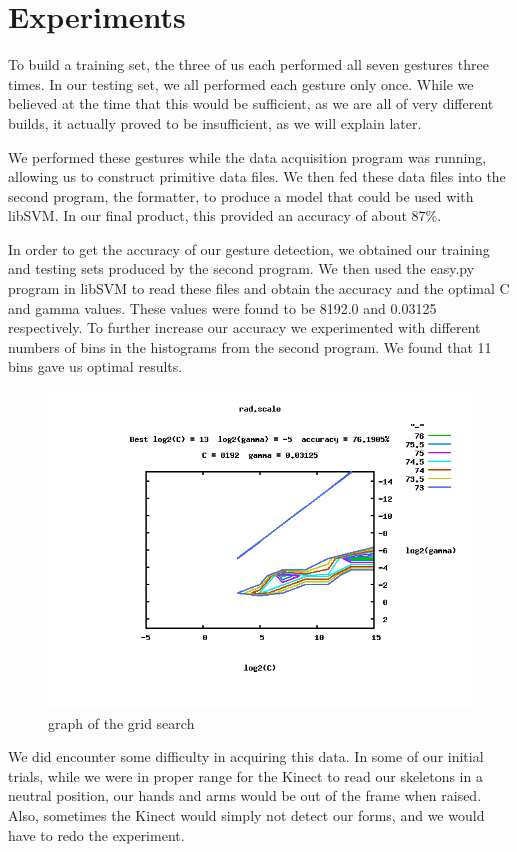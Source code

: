 \documentclass[11pt,conference]{IEEEtran}
\begin{document}
\section{Experiments}
To build a training set, the three of us each performed all seven gestures three times. In our testing set, we all performed each gesture only once. While we believed at the time that this would be sufficient, as we are all of very different builds, it actually proved to be insufficient, as we will explain later.

We performed these gestures while the data acquisition program was running, allowing us to construct primitive data files. We then fed these data files into the second program, the formatter, to produce a model that could be used with libSVM. In our final product, this provided an accuracy of about 87\%.

In order to get the accuracy of our gesture detection, we obtained our training and testing sets produced by the second program. We then used the easy.py program in libSVM to read these files and obtain the accuracy and the optimal C and gamma values. These values were found to be 8192.0 and 0.03125 respectively. To further increase our accuracy we experimented with different numbers of bins in the histograms from the second program. We found that 11 bins gave us optimal results.

\begin{figure}[h]
\caption{graph of the grid search}
\centering
\includegraphics[width=\linewidth]{scale}
\end{figure}

We did encounter some difficulty in acquiring this data. In some of our initial trials, while we were in proper range for the Kinect to read our skeletons in a neutral position, our hands and arms would be out of the frame when raised. Also, sometimes the Kinect would simply not detect our forms, and we would have to redo the experiment.
\end{document}

